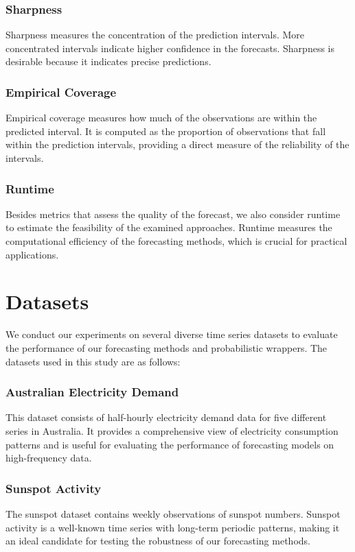 \subsubsection{Sharpness}
Sharpness measures the concentration of the prediction intervals. More concentrated intervals indicate higher confidence in the forecasts. Sharpness is desirable because it indicates precise predictions.

\subsubsection{Empirical Coverage}
Empirical coverage measures how much of the observations are within the predicted interval. It is computed as the proportion of observations that fall within the prediction intervals, providing a direct measure of the reliability of the intervals.

\subsubsection{Runtime}
Besides metrics that assess the quality of the forecast, we also consider runtime to estimate the feasibility of the examined approaches. Runtime measures the computational efficiency of the forecasting methods, which is crucial for practical applications.


\section{Datasets} \label{datasets}
We conduct our experiments on several diverse time series datasets to evaluate the performance of our forecasting methods and probabilistic wrappers. The datasets used in this study are as follows:

\subsubsection{Australian Electricity Demand}
This dataset consists of half-hourly electricity demand data for five different series in Australia. It provides a comprehensive view of electricity consumption patterns and is useful for evaluating the performance of forecasting models on high-frequency data.

\subsubsection{Sunspot Activity}
The sunspot dataset contains weekly observations of sunspot numbers. Sunspot activity is a well-known time series with long-term periodic patterns, making it an ideal candidate for testing the robustness of our forecasting methods.

